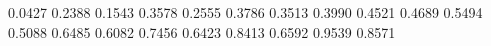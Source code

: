 0.0427 0.2388
0.1543 0.3578
0.2555 0.3786
0.3513 0.3990
0.4521 0.4689
0.5494 0.5088
0.6485 0.6082
0.7456 0.6423
0.8413 0.6592
0.9539 0.8571
